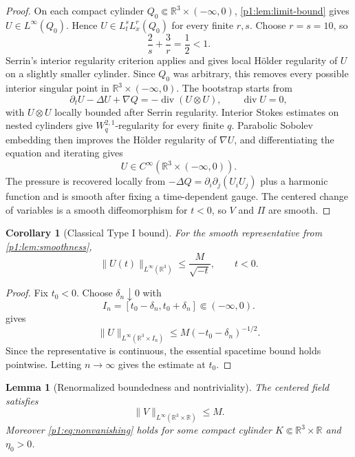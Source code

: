 \documentclass[11pt]{amsart}
\theoremstyle{plain}
\newtheorem{lemma}[lemma]{Lemma}
\newtheorem{corollary}[corollary]{Corollary}
\theoremstyle{definition}
\theoremstyle{remark}
\numberwithin{equation}{section}
\newcommand{\R}{\mathbb R}
\newcommand{\divergence}{\operatorname{div}}
\begin{document}
\begin{proof}
On each compact cylinder \(Q_0\Subset\R^3\times(-\infty,0)\),
\cref{p1:lem:limit-bound} gives \(U\in L^\infty(Q_0)\).  Hence
\(U\in L^s_tL^r_x(Q_0)\) for every finite \(r,s\).  Choose \(r=s=10\), so
\[
   \frac2s+\frac3r=\frac12<1.
\]
Serrin's interior regularity criterion \cite{Serrin1962,Sohr2001} applies and
gives local H\"older regularity of \(U\) on a slightly smaller cylinder.
Since \(Q_0\) was arbitrary, this removes every possible interior singular
point in \(\R^3\times(-\infty,0)\).  The bootstrap starts from
\[
   \partial_tU-\Delta U+\nabla Q=-\divergence(U\otimes U),\qquad
   \divergence U=0,
\]
with \(U\otimes U\) locally bounded after Serrin regularity.  Interior Stokes
estimates on nested cylinders give \(W^{2,1}_q\)-regularity for every finite
\(q\).  Parabolic Sobolev embedding then improves the H\"older regularity of
\(\nabla U\), and differentiating the equation and iterating gives
\[
   U\in C^\infty(\R^3\times(-\infty,0)).
\]
The pressure is recovered locally from
\(-\Delta Q=\partial_i\partial_j(U_iU_j)\) plus a harmonic function and is
smooth after fixing a time-dependent gauge.  The centered change of variables
is a smooth diffeomorphism for \(t<0\), so \(V\) and \(\Pi\) are smooth.
\end{proof}

\begin{corollary}[Classical Type I bound]\label{p1:cor:classical-type-I-bound}
For the smooth representative from \cref{p1:lem:smoothness},
\[
   \|U(t)\|_{L^\infty(\R^3)}\le \frac{M}{\sqrt{-t}},
   \qquad t<0.
\]
\end{corollary}

\begin{proof}
Fix \(t_0<0\).  Choose \(\delta_n\downarrow0\) with
\[
   I_n=[t_0-\delta_n,t_0+\delta_n]\Subset(-\infty,0).
\]
 gives
\[
   \|U\|_{L^\infty(\R^3\times I_n)}
   \le M(-t_0-\delta_n)^{-1/2}.
\]
Since the representative is continuous, the essential spacetime bound holds
pointwise.  Letting \(n\to\infty\) gives the estimate at \(t_0\).
\end{proof}

\begin{lemma}[Renormalized boundedness and nontriviality]
\label{p1:lem:renorm-bounds}
The centered field satisfies
\[
   \|V\|_{L^\infty(\R^3\times\R)}\le M.
\]
Moreover \eqref{p1:eq:nonvanishing} holds for some compact cylinder
\(K\Subset\R^3\times\R\) and \(\eta_0>0\).
\end{lemma}
\end{document}

